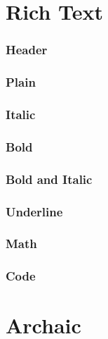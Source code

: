 \documentclass{article}
\begin{document}

\newpage
\section{Rich Text}

\subsubsection{Header}
\subsubsection{Plain}
\subsubsection{Italic}
\subsubsection{Bold}
\subsubsection{Bold and Italic}
\subsubsection{Underline}
\subsubsection{Math}
\subsubsection{Code}

\newpage
\section{Archaic}

\newpage
\end{document}
